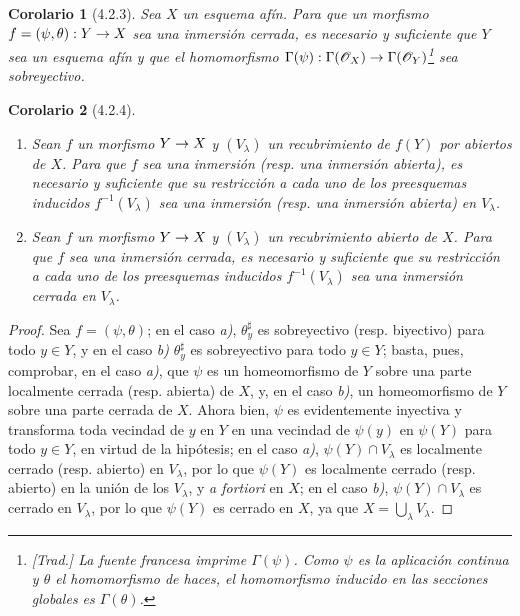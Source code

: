 \documentclass[oneside]{amsart}
\theoremstyle{ega-env-style}
\theoremstyle{ega-thm-env-style}
\newtheorem*{corollary}{Corolario}
\theoremstyle{ega-defn-env-style}
\renewcommand{\to}{\mathchoice{\longrightarrow}{\rightarrow}{\rightarrow}{\rightarrow}}
\newcommand{\oldpage}[2][]{{\marginnote{\normalfont{\textbf{#1}~|~#2}}}\ignorespaces}
\let\EGAOriginalLabel\label
\renewcommand{\label}[1]{\phantomsection\EGAOriginalLabel{#1}}
\begin{document}
\begin{corollary}[4.2.3]
\label{I.4.2.3}
Sea $X$ un esquema afín.
Para que un morfismo $f=(\psi,\theta):Y\to X$ sea una inmersión cerrada, es necesario y suficiente que $Y$ sea un esquema afín y que el homomorfismo $\Gamma(\psi):\Gamma(\mathscr{O}_X)\to\Gamma(\mathscr{O}_Y)$\footnote{\emph{[Trad.] La fuente francesa imprime $\Gamma(\psi)$. Como $\psi$ es la aplicación continua y $\theta$ el homomorfismo de haces, el homomorfismo inducido en las secciones globales es $\Gamma(\theta)$.}} sea sobreyectivo.
\end{corollary}

\begin{corollary}[4.2.4]
\label{I.4.2.4}
\medskip\noindent
\begin{enumerate}
  \item[\textup{a)}] Sean $f$ un morfismo $Y\to X$ y $(V_\lambda)$ un recubrimiento de $f(Y)$ por abiertos de $X$.
    Para que $f$ sea una inmersión (\textup{resp.} una inmersión abierta), es necesario y suficiente
\oldpage[I]{124}
    que su restricción a cada uno de los preesquemas inducidos $f^{-1}(V_\lambda)$ sea una inmersión (\textup{resp.} una inmersión abierta) en $V_\lambda$.
  \item[\textup{b)}] Sean $f$ un morfismo $Y\to X$ y $(V_\lambda)$ un recubrimiento abierto de $X$.
    Para que $f$ sea una inmersión cerrada, es necesario y suficiente que su restricción a cada uno de los preesquemas inducidos $f^{-1}(V_\lambda)$ sea una inmersión cerrada en $V_\lambda$.
\end{enumerate}
\end{corollary}

\begin{proof}
Sea $f=(\psi,\theta)$;
en el caso \emph{a)}, $\theta_y^\sharp$ es sobreyectivo (resp. biyectivo) para todo $y\in Y$, y en el caso \emph{b)} $\theta_y^\sharp$ es sobreyectivo para todo $y\in Y$;
basta, pues, comprobar, en el caso \emph{a)}, que $\psi$ es un homeomorfismo de $Y$ sobre una parte localmente cerrada (resp. abierta) de $X$, y, en el caso \emph{b)}, un homeomorfismo de $Y$ sobre una parte cerrada de $X$.
Ahora bien, $\psi$ es evidentemente inyectiva y transforma toda vecindad de $y$ en $Y$ en una vecindad de $\psi(y)$ en $\psi(Y)$ para todo $y\in Y$, en virtud de la hipótesis;
en el caso \emph{a)}, $\psi(Y)\cap V_\lambda$ es localmente cerrado (resp. abierto) en $V_\lambda$, por lo que $\psi(Y)$ es localmente cerrado (resp. abierto) en la unión de los $V_\lambda$, y \emph{a fortiori} en $X$;
en el caso \emph{b)}, $\psi(Y)\cap V_\lambda$ es cerrado en $V_\lambda$, por lo que $\psi(Y)$ es cerrado en $X$, ya que $X=\bigcup_\lambda V_\lambda$.
\end{proof}
\end{document}
